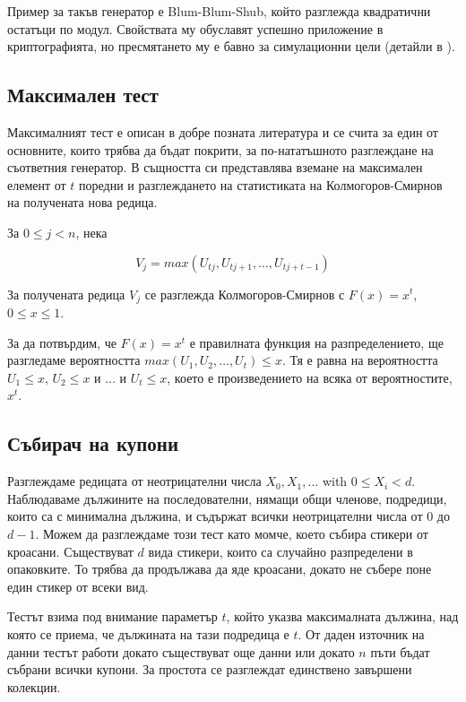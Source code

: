 \documentclass[12pt,a4paper]{article}
\theoremstyle{plain}
\begin{document}
        Пример за такъв генератор е Blum-Blum-Shub, който разглежда квадратични остатъци по модул. Свойствата му обуславят успешно приложение в криптографията, но пресмятането му е бавно за симулационни цели (детайли в \cite{BlumBlumShub}).

    \subsection{Максимален тест}

        Максималният тест е описан в добре позната литература и се счита за един от основните, които трябва да бъдат покрити, за по-нататъшното разглеждане на съответния генератор. \cite{KnuthV2} В същността си представлява вземане на максимален елемент от $t$ поредни и разглеждането на статистиката на Колмогоров-Смирнов на получената нова редица.
        
        За $0 \le j < n$, нека

        \[
            V_j = max(U_{tj}, U_{tj + 1}, \dots, U_{tj+t-1})
        \]

        За получената редица $V_j$ се разглежда Колмогоров-Смирнов с $F(x) = x^t$, $0 \le x \le 1$. \cite{KnuthV2}

        За да потвърдим, че $F(x) = x^t$ е правилната функция на разпределението, ще разгледаме вероятността $max(U_1, U_2, \dots, U_t) \le x$. Тя е равна на вероятността $U_1 \le x \text{, } U_2 \le x \text{ и } \dots \text{ и } U_t \le x$, което е произведението на всяка от вероятностите, $x^t$.

    \subsection{Събирач на купони}

        Разглеждаме редицата от неотрицателни числа $X_0, X_1, \dots$ with $0 \le X_i < d$. Наблюдаваме дължините на последователни, нямащи общи членове, подредици, които са с минимална дължина, и съдържат всички неотрицателни числа от $0$ до $d - 1$. Можем да разглеждаме този тест като момче, което събира стикери от кроасани. Съществуват $d$ вида стикери, които са случайно разпределени в опаковките. То трябва да продължава да яде кроасани, докато не събере поне един стикер от всеки вид.
        
        Тестът взима под внимание параметър $t$, който указва максималната дължина, над която се приема, че дължината на тази подредица е $t$. От даден източник на данни тестът работи докато съществуват още данни или докато $n$ пъти бъдат събрани всички купони. За простота се разглеждат единствено завършени колекции. \cite{KnuthV2}
\end{document}
